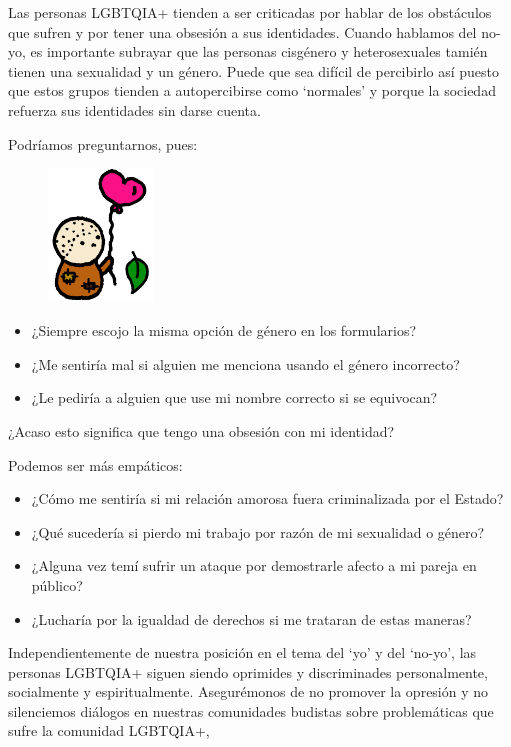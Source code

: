 \documentclass[12pt,openany]{book}
\begin{document}
Las personas LGBTQIA+ tienden a ser criticadas por hablar de los obstáculos que sufren y por tener una obsesión a sus identidades. Cuando hablamos del no-yo, es importante subrayar que las personas cisgénero y heterosexuales tamién tienen una sexualidad y un género. Puede que sea difícil de percibirlo así puesto que estos grupos tienden a autopercibirse como `normales' y porque la sociedad refuerza sus identidades sin darse cuenta.

Podríamos preguntarnos, pues:
\begin{figure}
    \centering
    \includegraphics[width=0.25\textwidth]{33c.png}
\end{figure}
\begin{itemize}
\setlength\itemsep{-0.3em}
\item ¿Siempre escojo la misma opción de género en los formularios?
\item ¿Me sentiría mal si alguien me menciona usando el género incorrecto?
\item ¿Le pediría a alguien que use mi nombre correcto si se equivocan?
\end{itemize}

¿Acaso esto significa que tengo una obsesión con mi identidad?

Podemos ser más empáticos:

\begin{itemize}
\setlength\itemsep{-0.3em}
\item ¿Cómo me sentiría si mi relación amorosa fuera criminalizada por el Estado?
\item ¿Qué sucedería si pierdo mi trabajo por razón de mi sexualidad o género?
\item ¿Alguna vez temí sufrir un ataque por demostrarle afecto a mi pareja en público?
\item ¿Lucharía por la igualdad de derechos si me trataran de estas maneras?
\end{itemize}

Independientemente de nuestra posición en el tema del `yo' y del `no-yo', las personas LGBTQIA+ siguen siendo oprimides y discriminades personalmente, socialmente y espiritualmente. Asegurémonos de no promover la opresión y no silenciemos diálogos en nuestras comunidades budistas sobre problemáticas que sufre la comunidad LGBTQIA+,
\end{document}
